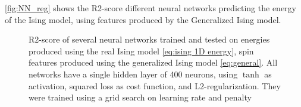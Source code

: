 \autoref{fig:NN_reg} shows the R2-score different neural networks predicting the energy of the Ising model, using features produced by the Generalized Ising model.

\begin{figure}[H]
\centering
{}
\qquad
{}
\caption{R2-score of several neural networks trained and tested on energies produced using the real Ising model \autoref{eq:ising 1D energy}, spin features produced using the generalized Ising model \autoref{eq:general}. All networks have a single hidden layer of 400 neurons, using $\tanh$ as activation, squared loss as cost function, and L2-regularization. They were trained using a grid search on learning rate and penalty}
\label{fig:NN_reg}
\end{figure}

